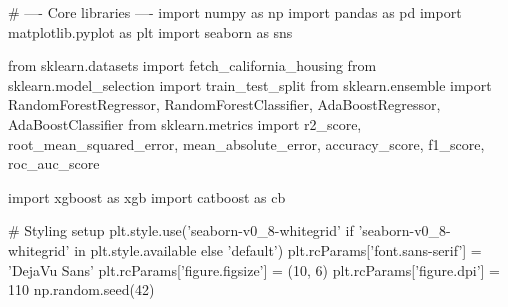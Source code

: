 
\begin{codebox}[title={Core libraries}]
# ---- Core libraries ----
import numpy as np
import pandas as pd
import matplotlib.pyplot as plt
import seaborn as sns

from sklearn.datasets import fetch_california_housing
from sklearn.model_selection import train_test_split
from sklearn.ensemble import RandomForestRegressor, RandomForestClassifier, AdaBoostRegressor, AdaBoostClassifier
from sklearn.metrics import r2_score, root_mean_squared_error, mean_absolute_error, accuracy_score, f1_score, roc_auc_score

import xgboost as xgb
import catboost as cb

# Styling setup
plt.style.use('seaborn-v0_8-whitegrid' if 'seaborn-v0_8-whitegrid' in plt.style.available else 'default')
plt.rcParams['font.sans-serif'] = 'DejaVu Sans'
plt.rcParams['figure.figsize'] = (10, 6)
plt.rcParams['figure.dpi'] = 110
np.random.seed(42)
\end{codebox}

